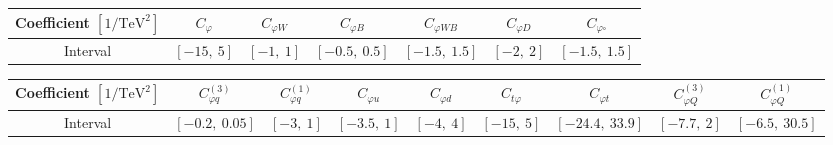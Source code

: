 \begin{tabular}{|c|c|c|c|c|c|c|}
\hline
Coefficient $[1/\mathrm{TeV}^2]$ & $C_\varphi$ & $C_{\varphi W}$ & $C_{\varphi B}$ & $C_{\varphi WB}$ & $C_{\varphi D}$ & $C_{\varphi\square}$ \\ \hline
Interval & $[-15,\ 5]$ & $[-1,\ 1]$ & $[-0.5,\ 0.5]$ & $[-1.5,\ 1.5]$ & $[-2,\ 2]$ & $[-1.5,\ 1.5]$ \\ \hline
\end{tabular}

\begin{tabular}{|c|c|c|c|c|c|c|c|c|}
\hline
Coefficient $[1/\mathrm{TeV}^2]$ & $C_{\varphi q}^{(3)}$ & $C_{\varphi q}^{(1)}$ & $C_{\varphi u}$ & $C_{\varphi d}$ & $C_{t\varphi}$ & $C_{\varphi t}$ & $C_{\varphi Q}^{(3)}$ & $C_{\varphi Q}^{(1)}$ \\ \hline
Interval & $[-0.2,\ 0.05]$ & $[-3,\ 1]$ & $[-3.5,\ 1]$ & $[-4,\ 4]$ & $[-15,\ 5]$ & $[-24.4,\ 33.9]$ & $[-7.7,\ 2]$ & $[-6.5,\ 30.5]$ \\ \hline
\end{tabular}
